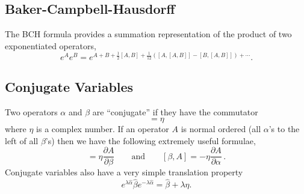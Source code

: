 \subsection{Baker-Campbell-Hausdorff}

The BCH formula provides a summation representation of the product of two exponentiated operators,
\begin{equation}
e^{A}e^{B}=e^{A+B+\frac{1}{2}[A,B]+\frac{1}{12}\left([A,[A,B]]-[B,[A,B]]\right)+\cdots}. \end{equation}

\subsection{Conjugate Variables}

Two operators $\alpha$ and $\beta$ are ``conjugate'' if they have the commutator
\begin{equation}
  [\alpha,\beta]=\eta
\end{equation}
where $\eta$ is a complex number.
If an operator $A$ is normal ordered (all $\alpha$'s to the left of all $\beta$'s) then we have the following extremely useful formulae,
\begin{equation}
  [\alpha,A] = \eta\frac{\partial A}{\partial\beta}
  \qquad\textrm{and}\qquad
  [\beta,A]=-\eta\frac{\partial A}{\partial\alpha}
  \, .
\end{equation}
Conjugate variables also have a very simple translation property
\begin{equation}
  e^{\lambda \hat{\alpha}}\hat{\beta}e^{-\lambda \hat{\alpha}}=\hat{\beta} + \lambda \eta.
\end{equation}
